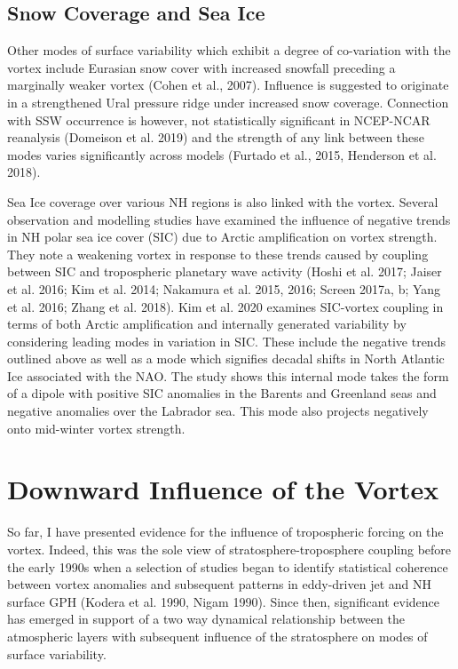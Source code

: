 \subsection{Snow Coverage and Sea Ice}
Other modes of surface variability which exhibit a degree of co-variation with the vortex include Eurasian snow cover with increased snowfall preceding a marginally weaker vortex (Cohen et al., 2007). Influence is suggested to originate in a strengthened Ural pressure ridge under increased snow coverage. Connection with SSW occurrence is however, not statistically significant in NCEP-NCAR reanalysis (Domeison et al. 2019) and the strength of any link between these modes varies significantly across models (Furtado et al., 2015, Henderson et al. 2018). 

Sea Ice coverage over various NH regions is also linked with the vortex. Several observation and modelling studies have examined the influence of negative trends in NH polar sea ice cover (SIC) due to Arctic amplification on vortex strength. They note a weakening vortex in response to these trends caused by coupling between SIC and tropospheric planetary wave activity (Hoshi et al. 2017; Jaiser et al. 2016; Kim et al. 2014; Nakamura et al. 2015, 2016; Screen 2017a, b; Yang et al. 2016; Zhang et al. 2018). Kim et al. 2020 examines SIC-vortex coupling in terms of both Arctic amplification and internally generated variability by considering leading modes in variation in SIC. These include the negative trends outlined above as well as a mode which signifies decadal shifts in North Atlantic Ice associated with the NAO. The study shows this internal mode takes the form of a dipole with positive SIC anomalies in the Barents and Greenland seas and negative anomalies over the Labrador sea. This mode also projects negatively onto mid-winter vortex strength. 

\section{Downward Influence of the Vortex}
So far, I have presented evidence for the influence of tropospheric forcing on the vortex. Indeed, this was the sole view of stratosphere-troposphere coupling before the early 1990s when a selection of studies began to identify statistical coherence between vortex anomalies and subsequent patterns in eddy-driven jet and NH surface GPH (Kodera et al. 1990, Nigam 1990). Since then, significant evidence has emerged in support of a two way dynamical relationship between the atmospheric layers with subsequent influence of the stratosphere on modes of surface variability.

